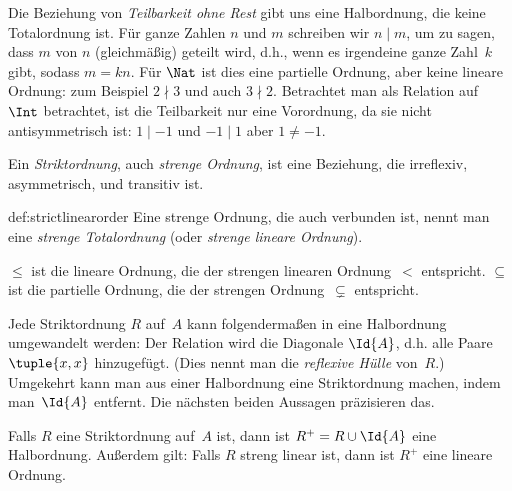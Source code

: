 \documentclass[../../../include/open-logic-section]{subfiles}
\begin{document}
\begin{ex}
Die Beziehung von \emph{Teilbarkeit ohne Rest} gibt uns eine
Halbordnung, die keine Totalordnung ist. Für ganze Zahlen $n$ und $m$ schreiben wir
$n\mid m$, um zu sagen, dass $m$ von $n$ (gleichmäßig) geteilt wird, d.h., wenn es
irgendeine ganze Zahl~$k$ gibt, sodass $m=kn$. Für $\Nat$ ist dies eine partielle Ordnung, aber keine
lineare Ordnung: zum Beispiel $2\nmid3$ und auch $3\nmid2$. Betrachtet man
als Relation auf $\Int$ betrachtet, ist die Teilbarkeit nur eine Vorordnung, da
sie nicht antisymmetrisch ist: $1\mid-1$ und $-1\mid1$ aber $1\neq-1$.
\end{ex}

\begin{defn}[Striktordnung]
Ein \emph{Striktordnung}, auch \emph{strenge Ordnung}, ist eine Beziehung, die irreflexiv, asymmetrisch,
und transitiv ist.
\end{defn}

\begin{defn}{def:strictlinearorder}
Eine strenge Ordnung, die auch verbunden ist, nennt man eine
\emph{strenge Totalordnung} (oder \emph{strenge lineare Ordnung}).
\end{defn}

\begin{ex}
$\le$ ist die lineare Ordnung, die der strengen linearen
Ordnung~$<$ entspricht. $\subseteq$ ist die partielle Ordnung, die der
strengen Ordnung~$\subsetneq$ entspricht.
\end{ex}

Jede Striktordnung $R$ auf~$A$ kann folgendermaßen in eine Halbordnung umgewandelt werden:
Der Relation wird die Diagonale $\Id{A}$, d.h. alle Paare~$\tuple{x,
x}$ hinzugefügt.  (Dies nennt man die \emph{reflexive Hülle} von~$R$.)
Umgekehrt kann man aus einer Halbordnung eine Striktordnung machen,
indem man~$\Id{A}$ entfernt. Die nächsten beiden Aussagen präzisieren das.
\begin{prop}
Falls $R$ eine Striktordnung auf~$A$ ist, dann ist $R^+ = R \cup \Id{A}$ eine
Halbordnung. Außerdem gilt: Falls $R$ streng linear ist, dann ist $R^+$ eine lineare
Ordnung.
\end{prop}
\end{document}
